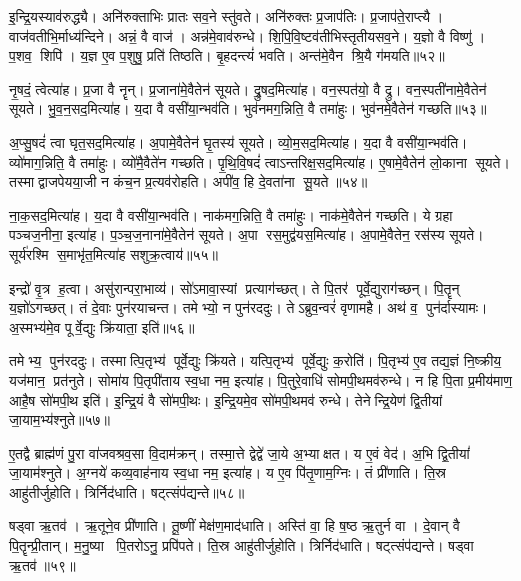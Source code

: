 इ॒न्द्रि॒यस्याव॑रुद्ध्यै। अनि॑रुक्ताभिः प्रातः सव॒ने स्तु॑वते। अनि॑रुक्तः प्र॒जाप॑तिः। प्र॒जाप॑ते॒राप्त्यै। वाज॑वतीभि॒र्माध्य॑न्दिने। अन्नं॒ वै वाज॑। अन्न॑मे॒वाव॑रुन्धे। शि॒पि॒वि॒ष्टव॑तीभिस्तृतीय\-सव॒ने। य॒ज्ञो वै विष्णु॑। प॒शव॒ शिपि॑। य॒ज्ञ ए॒व प॒शुषु॒ प्रति॑ तिष्ठति। बृ॒हदन्त्यं॑ भवति। अन्त॑मे॒वैन श्रि॒यै ग॑मयति॥५२॥\anuvakamend[अ॒श्नी॒यादन्न॑स्यान्न॒स्याव॑रुद्ध्या॒ इन्द्र॑स्य त्वा॒ साम्राज्येना॒भिषि॑ञ्चा॒मीत्या॑ह वाज॒सृत॒ शिपि॒स्त्रीणि॑ च]

नृ॒षदं॒ त्वेत्या॑ह। प्र॒जा वै नॄन्। प्र॒जाना॑मे॒वैतेन॑ सूयते। द्रु॒षद॒मित्या॑ह। वन॒स्पत॑यो॒ वै द्रु। वन॒स्पती॑नामे॒वैतेन॑ सूयते। भु॒व॒न॒सद॒मित्या॑ह। य॒दा वै वसी॑या॒न्भव॑ति। भुव॑नमग॒न्निति॒ वै तमा॑हुः। भुव॑नमे॒वैतेन॑ गच्छति॥५३॥

अ॒प्सु॒षदं॑ त्वा घृत॒सद॒मित्या॑ह। अ॒पामे॒वैतेन॑ घृ॒तस्य॑ सूयते। व्यो॒म॒सद॒मित्या॑ह। य॒दा वै वसी॑या॒न्भव॑ति। व्यो॑माग॒न्निति॒ वै तमा॑हुः। व्यो॑मै॒वैते॑न गच्छति। पृ॒थि॒वि॒षदं॑ त्वाऽन्तरिक्ष॒सद॒मित्या॑ह। ए॒षामे॒वैतेन॑ लो॒काना सूयते। तस्माद्वाजपेयया॒जी न कंच॒न प्र॒त्यव॑रोहति। अपी॑व॒ हि दे॒वता॑ना सू॒यते॥५४॥

ना॒क॒सद॒मित्या॑ह। य॒दा वै वसी॑या॒न्भव॑ति। नाक॑मग॒न्निति॒ वै तमा॑हुः। नाक॑मे॒वैतेन॑ गच्छति। ये ग्रहा पञ्चज॒नीना॒ इत्या॑ह। प॒ञ्च॒ज॒नाना॑मे॒वैतेन॑ सूयते। अ॒पा रस॒मुद्व॑यस॒मित्या॑ह। अ॒पामे॒वैतेन॒ रस॑स्य सूयते। सूर्य॑रश्मि स॒माभृ॑त॒मित्या॑ह सशुक्र॒त्वाय॑॥५५॥\anuvakamend[ग॒च्छ॒ति॒ सू॒यते॒ नव॑ च]

इन्द्रो॑ वृ॒त्र ह॒त्वा। असु॑रान्परा॒भाव्य॑। सो॑ऽमावा॒स्यां प्रत्याग॑च्छत्। ते पि॒तर॑ पूर्वे॒द्युराग॑च्छन्। पि॒तॄन् य॒ज्ञो॑ऽगच्छत्। तं दे॒वाः पुन॑रयाचन्त। तमेभ्यो॒ न पुन॑रददुः। तेऽब्रुव॒न्वरं॑ वृणामहै। अथ॑ व॒ पुन॑र्दास्यामः। अ॒स्मभ्य॑मे॒व पूर्वे॒द्युः क्रि॑याता॒ इति॑॥५६॥

तमेभ्य॒ पुन॑रददुः। तस्मात्पि॒तृभ्य॑ पूर्वे॒द्युः क्रि॑यते। यत्पि॒तृभ्य॑ पूर्वे॒द्युः क॒रोति॑। पि॒तृभ्य॑ ए॒व तद्य॒ज्ञं नि॒ष्क्रीय॒ यज॑मान॒ प्रत॑नुते। सोमा॑य पि॒तृपी॑ताय स्व॒धा नम॒ इत्या॑ह। पि॒तुरे॒वाधि॑ सोमपी॒थमव॑रुन्धे। न हि पि॒ता प्र॒मीय॑माण॒ आहै॒ष सो॑मपी॒थ इति॑। इ॒न्द्रि॒यं वै सो॑मपी॒थः। इ॒न्द्रि॒यमे॒व सो॑मपी॒थमव॑ रुन्धे। तेनेन्द्रि॒येण॑ द्वि॒तीयां जा॒याम॒भ्य॑श्नुते॥५७॥

ए॒तद्वै ब्राह्म॑णं पु॒रा वा॑जवश्रव॒सा वि॒दाम॑क्रन्। तस्मा॒त्ते द्वेद्वे॑ जा॒ये अ॒भ्याक्षत। य ए॒वं वेद॑। अ॒भि द्वि॒तीयां॑ जा॒याम॑श्नुते। अ॒ग्नये॑ कव्य॒वाह॑नाय स्व॒धा नम॒ इत्या॑ह। य ए॒व पि॑तृ॒णाम॒ग्निः। तं प्री॑णाति। ति॒स्र आहु॑तीर्जुहोति। त्रिर्निद॑धाति। षट्त्संप॑द्यन्ते॥५८॥

षड्वा ऋ॒तव॑। ऋ॒तूने॒व प्री॑णाति। तू॒ष्णीं मेक्ष॑ण॒माद॑धाति। अस्ति॑ वा॒ हि ष॒ष्ठ ऋ॒तुर्न वा। दे॒वान् वै पि॒तॄन्प्री॒तान्। म॒नु॒ष्या पि॒तरोऽनु॒ प्रपि॑पते। ति॒स्र आहु॑तीर्जुहोति। त्रिर्निद॑धाति। षट्त्संप॑द्यन्ते। षड्वा ऋ॒तव॑॥५९॥

